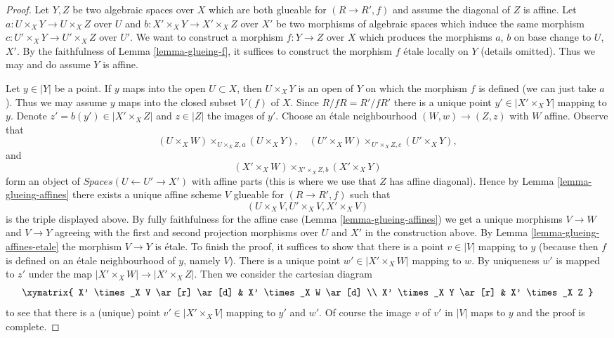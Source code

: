 \begin{proof}
Let $Y, Z$ be two algebraic spaces over $X$ which are both glueable for
$(R \to R', f)$ and assume the diagonal of $Z$ is affine. Let
$a : U \times_X Y \to U \times_X Z$ over $U$ and
$b : X' \times_X Y \to X' \times_X Z$ over $X'$ be two morphisms
of algebraic spaces
which induce the same morphism $c : U' \times_X Y \to U' \times_X Z$
over $U'$.
We want to construct a morphism $f : Y \to Z$ over $X$
which produces the morphisms $a$, $b$ on base change to $U$, $X'$.
By the faithfulness of Lemma \ref{lemma-glueing-f}, it suffices to construct
the morphism $f$ \'etale locally on $Y$ (details omitted).
Thus we may and do assume $Y$ is affine.

\medskip\noindent
Let $y \in |Y|$ be a point. If $y$ maps into the open $U \subset X$,
then $U \times_X Y$ is an open of $Y$ on which the morphism $f$
is defined (we can just take $a$).
Thus we may assume $y$ maps into the closed subset
$V(f)$ of $X$. Since $R/fR = R'/fR'$ there is a unique point
$y' \in |X' \times_X Y|$ mapping to $y$. Denote
$z' = b(y') \in |X' \times_X Z|$ and $z \in |Z|$ the images of $y'$.
Choose an \'etale neighbourhood $(W, w) \to (Z, z)$
with $W$ affine. Observe that
$$
(U \times_X W) \times_{U \times_X Z, a} (U \times_X Y),\quad
(U' \times_X W) \times_{U' \times_X Z, c} (U' \times_X Y),
$$
and
$$
(X' \times_X W) \times_{X' \times_X Z, b} (X' \times_X Y)
$$
form an object of $\textit{Spaces}(U \leftarrow U' \to X')$
with affine parts (this is where we use that $Z$ has affine diagonal).
Hence by Lemma \ref{lemma-glueing-affines}
there exists a unique affine scheme $V$ glueable for $(R \to R', f)$ such that
$$
(U \times_X V, U' \times_X V, X' \times_X V)
$$
is the triple displayed above. By fully faithfulness for the affine
case (Lemma \ref{lemma-glueing-affines}) we get a unique morphisms
$V \to W$ and $V \to Y$ agreeing with the first and second projection
morphisms over $U$ and $X'$ in the construction above.
By Lemma \ref{lemma-glueing-affines-etale} the morphism $V \to Y$ is \'etale.
To finish the proof, it suffices to show that there is a point $v \in |V|$
mapping to $y$ (because then $f$ is defined on an \'etale neighbourhood
of $y$, namely $V$).
There is a unique point $w' \in |X' \times_X W|$ mapping to $w$.
By uniqueness $w'$ is mapped to $z'$ under the map
$|X' \times_X W| \to |X' \times_X Z|$. Then we consider the cartesian
diagram
$$
\xymatrix{
X' \times_X V \ar[r] \ar[d] & X' \times_X W \ar[d] \\
X' \times_X Y \ar[r] & X' \times_X Z
}
$$
to see that there is a (unique) point $v' \in |X' \times_X V|$
mapping to $y'$ and $w'$. Of course the image $v$ of $v'$
in $|V|$ maps to $y$ and the proof is complete.
\end{proof}

